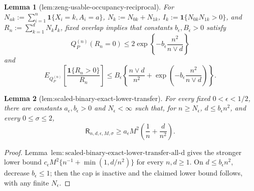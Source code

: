\documentclass{article}
\newtheorem{lemma}{Lemma}
\begin{document}
\begin{lemma}[lem:zeng-usable-occupancy-reciprocal]\label{lem:zeng-usable-occupancy-reciprocal}
For \(N_{ak}:=\sum_{i=1}^n\mathbf 1\{X_i=k,A_i=a\}\), \(N_k:=N_{0k}+N_{1k}\), \(I_k:=\mathbf 1\{N_{0k}N_{1k}>0\}\), and \(R_n:=\sum_{k=1}^dN_kI_k\), fixed overlap implies that constants \(b_{\epsilon},B_{\epsilon}>0\) satisfy
\[
 Q_P^{(n)}(R_n=0)\le2\exp\left\{-b_{\epsilon}\frac{n^2}{n\vee d}\right\}
\]
and
\[
 E_{Q_P^{(n)}}\left[\frac{\mathbf 1\{R_n>0\}}{R_n}\right]
 \le B_{\epsilon}\left\{\frac{n\vee d}{n^2}+\exp\left(-b_{\epsilon}\frac{n^2}{n\vee d}\right)\right\}.
\]
\end{lemma}

\begin{lemma}[lem:scaled-binary-exact-lower-transfer]\label{lem:scaled-binary-exact-lower-transfer}
For every fixed \(0<\epsilon<1/2\), there are constants \(a_{\epsilon},b_{\epsilon}>0\) and \(N_{\epsilon}<\infty\) such that, for \(n\ge N_{\epsilon}\), \(d\le b_{\epsilon}n^2\), and every \(0\le\sigma\le2\),
\[
 \mathsf R_{n,d,\epsilon,M,\sigma}
 \ge a_{\epsilon}M^2\left(\frac1n+\frac d{n^2}\right).
\]
\end{lemma}
\begin{proof}
Lemma~\(\mathrm{lem:scaled\text{-}binary\text{-}exact\text{-}lower\text{-}transfer\text{-}all\text{-}d}\) gives the stronger lower bound \(c_{\epsilon}M^2\{n^{-1}+\min(1,d/n^2)\}\) for every \(n,d\ge1\).  On \(d\le b_{\epsilon}n^2\), decrease \(b_{\epsilon}\le1\); then the cap is inactive and the claimed lower bound follows, with any finite \(N_{\epsilon}\).
\end{proof}
\end{document}
